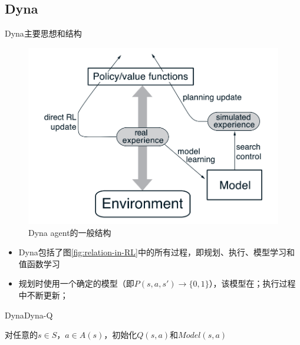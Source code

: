 \documentclass[10pt]{beamer}
\begin{document}
	\subsection{Dyna}
	
	\begin{frame}{Dyna}{主要思想和结构}
		\begin{figure}
			\centering
			\includegraphics[width=0.6\linewidth]{pictures/dyna-arch.png}
			\caption{Dyna agent的一般结构}
			\label{fig:dyna-arch}
		\end{figure}
		
		\begin{itemize}
			\item<2-> Dyna\cite{Sutton1990:Dyna}包括了图\ref{fig:relation-in-RL}中的所有过程，即\alert{规划}、\alert{执行}、\alert{模型学习}和\alert{值函数学习}
			\item<3-> 规划时使用一个确定的模型（即$P(s,a,s') \rightarrow \{0,1\}$），该模型在；执行过程中不断更新；
		\end{itemize}
	\end{frame}

	\begin{frame}{Dyna}{Dyna-Q}
		\begin{algorithm}[H]
			对任意的$s \in S$，$a \in A(s)$，初始化$Q(s,a)$和$Model(s,a)$\;
			\caption{Dyna-Q算法}\label{alg:dyna-q}
		\end{algorithm}
	\end{frame}
\end{document}

